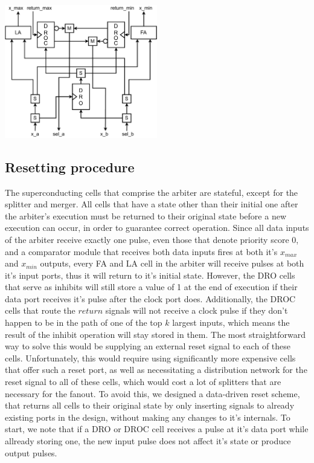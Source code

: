 \documentclass{article}
\begin{document}
\includegraphics*[width=0.5\textwidth]{diagrams/circuit_comparator.drawio.pdf}

\subsection{Resetting procedure}
The superconducting cells that comprise the arbiter are stateful, except for the splitter and merger.
All cells that have a state other than their initial one after the arbiter's execution must be returned to their original state before a new execution can occur, in order to guarantee correct operation.
Since all data inputs of the arbiter receive exactly one pulse, even those that denote priority score 0, and a comparator module that receives both data inputs fires at both it's $x_{max}$ and $x_{min}$ outputs, every FA and LA cell in the arbiter will receive pulses at both it's input ports, thus it will return to it's initial state.
However, the DRO cells that serve as inhibits will still store a value of 1 at the end of execution if their data port receives it's pulse after the clock port does. 
Additionally, the DROC cells that route the $return$ signals will not receive a clock pulse if they don't happen to be in the path of one of the top $k$ largest inputs, which means the result of the inhibit operation will stay stored in them.
The most straightforward way to solve this would be supplying an external reset signal to each of these cells.
Unfortunately, this would require using significantly more expensive cells that offer such a reset port, as well as necessitating a distribution network for the reset signal to all of these cells, which would cost a lot of splitters that are necessary for the fanout.
To avoid this, we designed a data-driven reset scheme, that returns all cells to their original state by only inserting signals to already existing ports in the design, without making any changes to it's internals.
To start, we note that if a DRO or DROC cell receives a pulse at it's data port while allready storing one, the new input pulse does not affect it's state or produce output pulses. 
\end{document}

